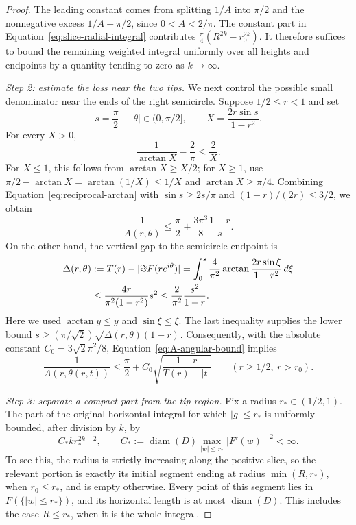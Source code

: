 \begin{proof}
The leading constant comes from splitting \(1/A\) into \(\pi/2\) and
the nonnegative excess \(1/A-\pi/2\), since \(0<A<2/\pi\).
The constant part in Equation~\eqref{eq:slice-radial-integral} contributes
\(\frac{\pi}{4}(R^{2k}-r_0^{2k})\).  It therefore suffices to bound
the remaining weighted integral uniformly over all heights and endpoints
by a quantity tending to zero as \(k\to\infty\).

\medskip
\noindent\textit{Step 2: estimate the loss near the two tips.}
We next control the possible small denominator near the ends of the
right semicircle.  Suppose \(1/2\le r<1\) and set
\[
 s=\frac{\pi}{2}-|\theta|\in(0,\pi/2],
 \qquad
 X=\frac{2r\sin s}{1-r^2}.
\]
For every \(X>0\),
\begin{equation}\label{eq:reciprocal-arctan}
 \frac{1}{\arctan X}-\frac{2}{\pi}\le\frac{2}{X}.
\end{equation}
For \(X\le1\), this follows from \(\arctan X\ge X/2\); for \(X\ge1\),
use \(\pi/2-\arctan X=\arctan(1/X)\le1/X\) and
\(\arctan X\ge\pi/4\).  Combining
Equation~\eqref{eq:reciprocal-arctan} with
\(\sin s\ge2s/\pi\) and \((1+r)/(2r)\le3/2\), we obtain
\begin{equation}\label{eq:A-angular-bound}
 \frac1{A(r,\theta)}
    \le\frac{\pi}{2}+\frac{3\pi^3}{8}\frac{1-r}{s}.
\end{equation}
On the other hand, the vertical gap to the semicircle endpoint is
\begin{align}
 \Delta(r,\theta)
   &:=T(r)-|\Im F(re^{i\theta})|
     =\int_0^s\frac{4}{\pi^2}
          \arctan\frac{2r\sin\xi}{1-r^2}\,d\xi \notag\\
   &\le\frac{4r}{\pi^2(1-r^2)}s^2
     \le\frac{2}{\pi^2}\frac{s^2}{1-r}.
 \label{eq:vertical-gap}
\end{align}
Here we used \(\arctan y\le y\) and \(\sin\xi\le\xi\).
The last inequality supplies the lower bound
\(s\ge(\pi/\sqrt2)\sqrt{\Delta(r,\theta)(1-r)}\).
Consequently, with the absolute constant
\(C_0=3\sqrt2\pi^2/8\), Equation~\eqref{eq:A-angular-bound} implies
\begin{equation}\label{eq:A-slice-bound}
 \frac1{A(r,\theta(r,t))}
   \le\frac{\pi}{2}
        +C_0\sqrt{\frac{1-r}{T(r)-|t|}}
 \qquad (r\ge1/2,\ r>r_0).
\end{equation}

\medskip
\noindent\textit{Step 3: separate a compact part from the tip region.}
Fix a radius \(r_*\in(1/2,1)\).  The part of the original horizontal
integral for which \(|g|\le r_*\) is uniformly bounded, after division
by \(k\), by
\begin{equation}\label{eq:slice-inner-bound}
 C_*k r_*^{2k-2},
 \qquad
 C_*:=\operatorname{diam}(D)
          \max_{|w|\le r_*}|F'(w)|^{-2}<\infty.
\end{equation}
To see this, the radius is strictly increasing along the positive
slice, so the relevant portion is exactly its initial segment ending
at radius \(\min(R,r_*)\), when \(r_0\le r_*\), and is empty otherwise.
Every point of this segment lies in \(F(\{|w|\le r_*\})\), and its
horizontal length is at most \(\operatorname{diam}(D)\).
This includes the case \(R\le r_*\), when it is the whole integral.


\end{proof}

